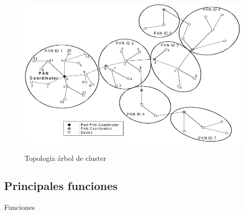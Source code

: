 \begin{figure}[h!]
	\centering
    \includegraphics[width=.8\textwidth]{./Figures/cluster.jpg}
	\label{fig:clust}
	\caption{Topología árbol de cluster}
\end{figure}

\subsection{Principales funciones}

Funciones

